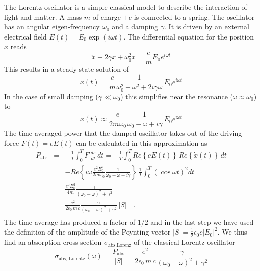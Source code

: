 The Lorentz oscillator is a simple classical model to describe the interaction of light and matter. A mass $m$ of charge $+e$ is connected to a spring. The oscillator has an angular eigen-frequency $\omega_0$ and a damping $\gamma$. It is driven by an external electrical field $E(t) = E_0 \exp(i \omega t)$. The differential equation for the position $x$ reads
\begin{equation}
  \ddot{x} + 2  \gamma  \dot{x} + \omega_0^2 x =  \frac{e}{m} E_0 e^{i \omega t}
\end{equation}
This results in a steady-state solution of 
\begin{equation}
  x(t) = \frac{e}{m}  \frac{1}{\omega_0^2 - \omega^2 +2  i \gamma \omega } \, E_0 e^{i \omega t} 
\end{equation}
In the case of small damping ($\gamma \ll \omega_0$) this simplifies near the resonance ($\omega \approx \omega_0$) to
\begin{equation}
  x(t) \approx \frac{e}{2 m \omega_0}  \frac{1}{\omega_0 - \omega + i \gamma } \, E_0 e^{i \omega t} 
\end{equation}
The time-averaged power  that the damped oscillator takes out of the driving force $F(t) = e E(t)$ can be calculated in this approximation as
%
\begin{eqnarray}
 P_{\text{abs}} &= &  - \frac{1}{T} \int_0^T F \, \frac{ds}{dt} \, dt =  
  - \frac{1}{T}  \int_0^T Re \left\{  e E(t) \right\}  \, Re \left\{ \dot{x}(t) \right\} \, dt \\
  & = & - Re \left\{i \omega  \frac{e^2  E_0^2 }{2 m \omega_0}  \frac{1}{\omega_0 - \omega +  i \gamma } \right\}  \,   \frac{1}{T}  \int_0^T \left( \cos \omega t \right)^2 dt \\
%
& = & \frac{e^2 E_0^2  }{4 m }  \frac{\gamma }{(\omega_0 - \omega)^2 +  \gamma ^2}  \\
&  = &  \frac{e^2  }{2 \epsilon_0 \, m \,c }  \frac{\gamma }{(\omega_0 - \omega)^2 +  \gamma ^2}  \, |S|  \quad .\\
\end{eqnarray}
%
The time average has produced a factor of $1/2$ and in the last step we have used the definition of the amplitude of the Poynting vector $|S| = \frac{1}{2} \epsilon_0 c |E_0|^2$. 
We thus find an absorption cross section $\sigma_{\text{abs,Lorenz}}$ of the classical Lorentz oscillator
\begin{equation}
 \sigma_{\text{abs, Lorentz}}(\omega) = \frac{ P_{\text{abs}} }{|S| } = \frac{e^2  }{2 \epsilon_0 \,  m \, c}  \frac{\gamma }{(\omega_0 - \omega)^2 +  \gamma ^2} 
\end{equation}

